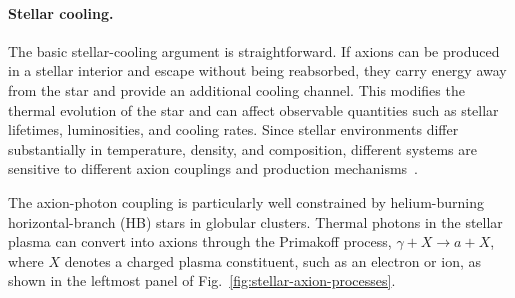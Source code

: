 \documentclass[review]{elsarticle}
\numberwithin{equation}{section}
\numberwithin{table}{section}
\numberwithin{figure}{section}
\begin{document}
\paragraph{Stellar cooling.}

The basic stellar-cooling argument is straightforward. If axions can be produced in a stellar interior and escape without being reabsorbed, they carry energy away from the star and provide an additional cooling channel. This modifies the thermal evolution of the star and can affect observable quantities such as stellar lifetimes, luminosities, and cooling rates. Since stellar environments differ substantially in temperature, density, and composition, different systems are sensitive to different axion couplings and production mechanisms~\cite{Raffelt:2006cw,Caputo:2024oqc}.

The axion-photon coupling is particularly well constrained by helium-burning horizontal-branch (HB) stars in globular clusters. Thermal photons in the stellar plasma can convert into axions through the Primakoff process,
$\gamma+X\rightarrow a+X$, where $X$ denotes a charged plasma constituent, such as an electron or ion, as shown in the leftmost panel of Fig.~\ref{fig:stellar-axion-processes}.
\end{document}

